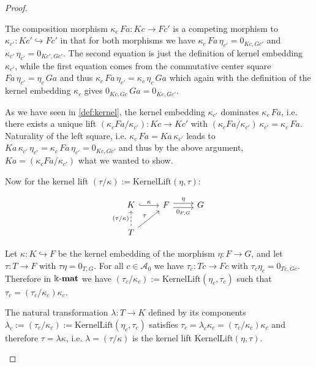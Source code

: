 \begin{proof}
\begin{enumerate}
\begin{subproof}[Proof of (ii)]
The composition morphism $\kappa_{c}\,Fa : Kc \rightarrow Fc'$ is a competing morphism to $\kappa_{c'} : Kc' \hookrightarrow Fc'$ in that
for both morphisms we have $\kappa_{c}\,Fa\,\eta_{c'} = 0_{Kc,Gc'}$ and $\kappa_{c'}\,\eta_{c'} = 0_{Kc',Gc'}$. The second equation
is just the definition of kernel embedding $\kappa_{c'}$, while the first equation comes from the commutative center
square $Fa\,\eta_{c'} = \eta_{c}\,Ga$ and thus $\kappa_{c}\,Fa\,\eta_{c'} = \kappa_{c}\,\eta_{c}\,Ga$ which again with the definition
of the kernel embedding $\kappa_{c}$ gives $0_{Kc,Gc}\,Ga = 0_{Kc,Gc'}$.

As we have seen in \ref{def:kernel}, the kernel embedding $\kappa_{c'}$ dominates $\kappa_{c}\,Fa$, i.e. there exists a
unique lift $(\kappa_{c}Fa/\kappa_{c'}) : Kc \rightarrow Kc'$ with $(\kappa_{c}Fa/\kappa_{c'})\,\kappa_{c'} = \kappa_{c}\,Fa$.
Naturality of the left square, i.e. $\kappa_{c}\,Fa = Ka\,\kappa_{c'}$ leads to
$Ka\,\kappa_{c'}\,\eta_{c'} = \kappa_{c}\,Fa\,\eta_{c'} = 0_{Kc,Gc'}$ and thus by the above argument, $Ka = (\kappa_{c}Fa/\kappa_{c'})$
what we wanted to show.

Now for the kernel lift $(\tau / \kappa) := \mathrm{KernelLift}(\eta, \tau)$:

\[
\begin{tikzcd}
K \arrow[r, "\kappa", hook]                                   & F \arrow[r, "\eta", shift left] \arrow[r, "{0_{F,G}}"', shift right] & G \\
T \arrow[ru, "\tau"] \arrow[u, "(\tau / \kappa)", dashed] &                     &  
\end{tikzcd}
\]

Let $\kappa : K \hookrightarrow F$ be the kernel embedding of the morphism $\eta : F \rightarrow G$, and let $\tau : T \rightarrow F$
with $\tau \eta = 0_{T,G}$. For all $c \in \mathcal{A}_{0}$ we have
$\tau_{c} : Tc \rightarrow Fc$ with $\tau_{c} \eta_{c} = 0_{Tc,Gc}$. Therefore in $\Bbbk\textnormal{-}\mathbf{mat}$ we have
$(\tau_{c} / \kappa_{c} ) := \mathrm{KernelLift}( \eta_{c}, \tau_{c} )$ such that $\tau_{c} = (\tau_{c} / \kappa_{c} ) \kappa_{c}$.

The natural transformation $\lambda : T \rightarrow K$ defined by its components\\
$\lambda_{c} := (\tau_{c} / \kappa_{c}) := \mathrm{KernelLift}( \eta_{c}, \tau_{c} )$ satisfies
$\tau_{c} = \lambda_{c} \kappa_{c} = (\tau_{c} / \kappa_{c} ) \kappa_{c}$ and therefore
$\tau = \lambda \kappa$, i.e. $\lambda = (\tau / \kappa)$ is the kernel lift $\mathrm{KernelLift}(\eta, \tau)$.


\end{subproof}
\end{enumerate}
\end{proof}
